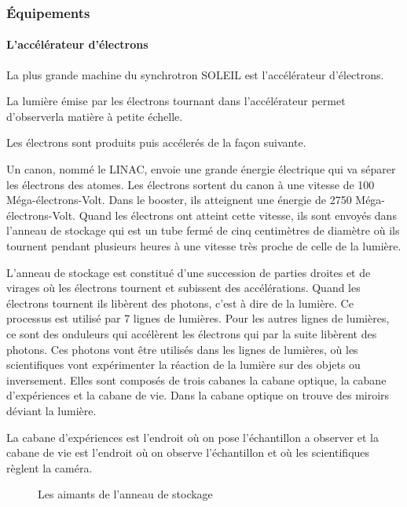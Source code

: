 		\subsubsection{Équipements}
			
			\paragraph{L'accélérateur d'électrons}
				La plus grande machine du synchrotron SOLEIL est l'accélérateur d'électrons.
				
				La lumière émise par les électrons tournant dans l'accélérateur permet d'observerla matière à petite échelle.
				
				Les électrons sont produits puis accélerés de la façon suivante.
				
				Un canon, nommé le LINAC, envoie une grande énergie électrique qui va séparer les électrons des atomes. Les électrons sortent du canon à une vitesse de 100 Méga-électrons-Volt.  Dans le booster, ils atteignent une énergie de 2750 Méga-électrons-Volt. Quand les électrons ont atteint cette vitesse, ils sont envoyés dans l'anneau de stockage qui est un tube fermé de cinq centimètres de diamètre où ils tournent pendant plusieurs heures à une vitesse très proche de celle de la lumière. 

				L'anneau de stockage est constitué d'une succession de parties droites et de virages où les électrons tournent et subissent des accélérations. Quand les électrons tournent ils libèrent des photons, c'est à dire de la lumière. Ce processus est utilisé par 7 lignes de lumières. Pour les autres lignes de lumières, ce sont des onduleurs qui accélèrent les électrons qui par la suite libèrent des photons. Ces photons vont être utilisés dans les lignes de lumières, où les scientifiques vont expérimenter la réaction de la lumière sur des objets ou inversement. Elles sont composés de trois cabanes\: la cabane optique, la cabane d'expériences et la cabane de vie. Dans la cabane optique on trouve des miroirs déviant la lumière.

			    La cabane d'expériences est l'endroit où on pose l'échantillon a observer et la cabane de vie est l'endroit où on observe l'échantillon et où les scientifiques règlent la caméra. 
			\begin{figure}
 				 \centering
 				 \caption{Les aimants de l'anneau de stockage}
				\end{figure}

